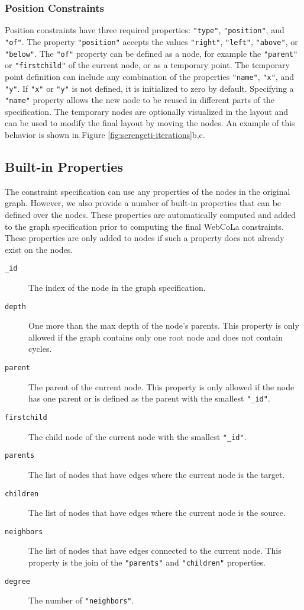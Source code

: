 \subsubsection{Position Constraints}
Position constraints have three required properties: \texttt{"type"}, \texttt{"position"}, and \texttt{"of"}. The property \texttt{"position"} accepts the values \texttt{"right"}, \texttt{"left"}, \texttt{"above"}, or \texttt{"below"}. The \texttt{"of"} property can be defined as a node, for example the \texttt{"parent"} or \texttt{"firstchild"} of the current node, or as a temporary point. The temporary point definition can include any combination of the properties \texttt{"name"}, \texttt{"x"}, and \texttt{"y"}. If \texttt{"x"} or \texttt{"y"} is not defined, it is initialized to zero by default. Specifying a \texttt{"name"} property allows the new node to be reused in different parts of the specification. The temporary nodes are optionally visualized in the layout and can be used to modify the final layout by moving the nodes. An example of this behavior is shown in Figure \ref{fig:serengeti-iterations}b,c.

\subsection{Built-in Properties}
The constraint specification can use any properties of the nodes in the original graph. However, we also provide a number of built-in properties that can be defined over the nodes. These properties are automatically computed and added to the graph specification prior to computing the final WebCoLa constraints. These properties are only added to nodes if such a property does not already exist on the nodes.

\begin{description}
\item[\texttt{\_id}] The index of the node in the graph specification.
\item[\texttt{depth}] One more than the max depth of the node's parents. This property is only allowed if the graph contains only one root node and does not contain cycles.
\item[\texttt{parent}] The parent of the current node. This property is only allowed if the node has one parent or is defined as the parent with the smallest \texttt{"\_id"}.
\item[\texttt{firstchild}] The child node of the current node with the smallest \texttt{"\_id"}.
\item[\texttt{parents}] The list of nodes that have edges where the current node is the target.
\item[\texttt{children}] The list of nodes that have edges where the current node is the source.
\item[\texttt{neighbors}] The list of nodes that have edges connected to the current node. This property is the join of the \texttt{"parents"} and \texttt{"children"} properties.
\item[\texttt{degree}] The number of \texttt{"neighbors"}.
\end{description}
